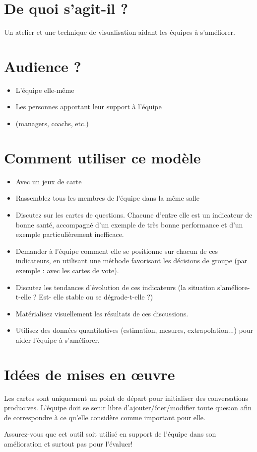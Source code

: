 \documentclass[10pt]{article}
\begin{document}
\begin{minipage}{0.6\linewidth}
\section*{De  quoi  s’agit-il ?}
Un  atelier et  une technique de  visualisation  aidant  les équipes à s’améliorer.

\section*{Audience  ?}
\begin{itemize}
  \item L’équipe  elle-même 
  \item Les personnes apportant leur  support à l’équipe
  \item (managers,  coachs, etc.) 
\end{itemize}


\section*{Comment utiliser  ce  modèle}
\begin{itemize}
  \item Avec un jeux de carte
  \item Rassemblez  tous  les membres de  l’équipe  dans  la  même  salle 
  \item Discutez  sur les cartes  de  questions. Chacune d’entre elle  est un  indicateur  de  bonne santé,  accompagné  d’un  exemple de  très  bonne performance et  d’un  exemple particulièrement  inefficace. 
  \item Demander  à l’équipe  comment elle  se  positionne sur chacun  de  ces indicateurs,  en  utilisant une méthode favorisant  les décisions de  groupe  (par  exemple : avec  les cartes  de  vote).  
  \item Discutez  les tendances d’évolution de  ces indicateurs (la situation s’améliore-t-elle ? Est- elle  stable  ou  se  dégrade-t-elle  ?)
  \item Matérialisez  visuellement  les résultats de  ces discussions.  
  \item Utilisez des données quantitatives (estimation,  mesures,  extrapolation...)  pour  aider l’équipe  à s’améliorer.  
\end{itemize}


\section*{Idées de  mises en  œuvre}
  Les cartes  sont  uniquement  un  point de  départ  pour  initialiser des conversations produc:ves. L’équipe  doit  se  sen:r libre d’ajouter/ôter/modifier toute ques:on afin  de  correspondre  à ce  qu’elle considère comme important pour  elle.

  Assurez-vous  que cet outil  soit  utilisé  en  support de  l’équipe  dans  son amélioration  et  surtout pas pour  l’évaluer!
\end{minipage} \hfill
\end{document}
